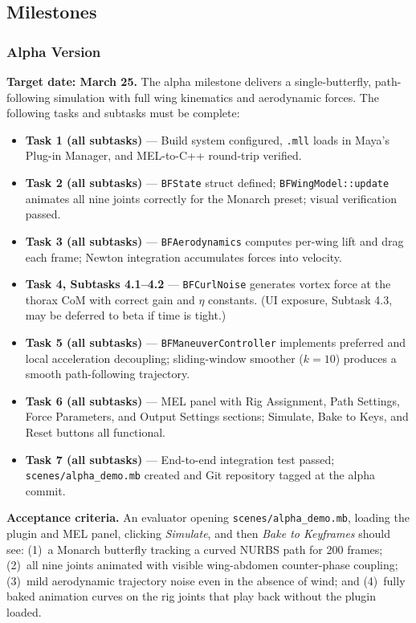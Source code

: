 \documentclass[12pt]{article}
\begin{document}
\subsection{Milestones}

\subsubsection{Alpha Version}

\textbf{Target date: March 25.} \quad
The alpha milestone delivers a single-butterfly, path-following simulation with
full wing kinematics and aerodynamic forces. The following tasks and subtasks must
be complete:

\begin{itemize}
  \item \textbf{Task 1 (all subtasks)} --- Build system configured, \texttt{.mll}
    loads in Maya's Plug-in Manager, and MEL-to-C++ round-trip verified.
  \item \textbf{Task 2 (all subtasks)} --- \texttt{BFState} struct defined;
    \texttt{BFWingModel::update} animates all nine joints correctly for the Monarch
    preset; visual verification passed.
  \item \textbf{Task 3 (all subtasks)} --- \texttt{BFAerodynamics} computes per-wing
    lift and drag each frame; Newton integration accumulates forces into velocity.
  \item \textbf{Task 4, Subtasks 4.1--4.2} --- \texttt{BFCurlNoise} generates
    vortex force at the thorax CoM with correct gain and $\eta$ constants. (UI
    exposure, Subtask 4.3, may be deferred to beta if time is tight.)
  \item \textbf{Task 5 (all subtasks)} --- \texttt{BFManeuverController} implements
    preferred and local acceleration decoupling; sliding-window smoother ($k=10$)
    produces a smooth path-following trajectory.
  \item \textbf{Task 6 (all subtasks)} --- MEL panel with Rig Assignment, Path
    Settings, Force Parameters, and Output Settings sections; Simulate, Bake to Keys,
    and Reset buttons all functional.
  \item \textbf{Task 7 (all subtasks)} --- End-to-end integration test passed;
    \texttt{scenes/alpha\_demo.mb} created and Git repository tagged at the alpha
    commit.
\end{itemize}

\noindent\textbf{Acceptance criteria.}
An evaluator opening \texttt{scenes/alpha\_demo.mb}, loading the plugin and MEL
panel, clicking \textit{Simulate}, and then \textit{Bake to Keyframes} should
see: (1)~a Monarch butterfly tracking a curved NURBS path for 200 frames;
(2)~all nine joints animated with visible wing-abdomen counter-phase coupling;
(3)~mild aerodynamic trajectory noise even in the absence of wind; and
(4)~fully baked animation curves on the rig joints that play back without the
plugin loaded.
\end{document}
